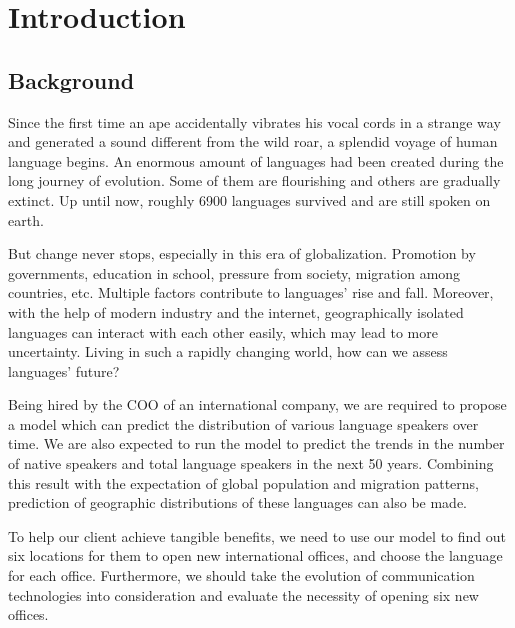 \documentclass{mcmthesis}
\begin{document}
\section{Introduction}
\subsection{Background}
Since the first time an ape accidentally vibrates his vocal cords in a strange way and generated a sound different from the wild roar, a splendid voyage of human language begins. An enormous amount of languages had been created during the long journey of evolution. Some of them are flourishing and others are gradually extinct. Up until now, roughly 6900 languages survived and are still spoken on earth.

But change never stops, especially in this era of globalization. Promotion by governments, education in school, pressure from society, migration among countries, etc. Multiple factors contribute to languages' rise and fall. Moreover, with the help of modern industry and the internet, geographically isolated languages can interact with each other easily, which may lead to more uncertainty. Living in such a rapidly changing world, how can we assess languages' future?

Being hired by the COO of an international company, we are required to propose a model which can predict the distribution of various language speakers over time. We are also expected to run the model to predict the trends in the number of native speakers and total language speakers in the next 50 years. Combining this result with the expectation of global population and migration patterns, prediction of geographic distributions of these languages can also be made.

To help our client achieve tangible benefits, we need to use our model to find out six locations for them to open new international offices, and choose the language for each office. Furthermore, we should take the evolution of communication technologies into consideration and evaluate the necessity of opening six new offices.
\end{document}
